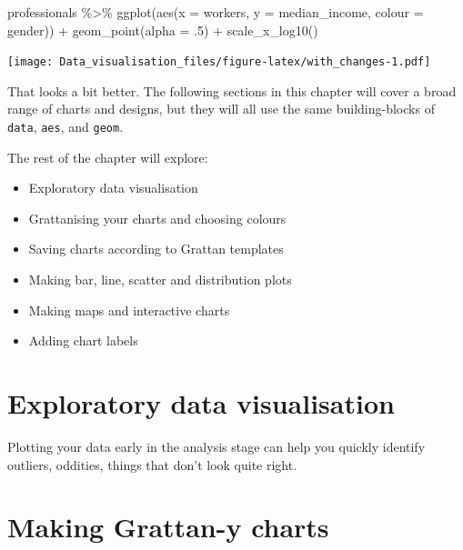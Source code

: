\documentclass[
]{book}
\newenvironment{Shaded}{\begin{snugshade}}{\end{snugshade}}
\newcommand{\AttributeTok}[1]{\textcolor[rgb]{0.77,0.63,0.00}{#1}}
\newcommand{\DecValTok}[1]{\textcolor[rgb]{0.00,0.00,0.81}{#1}}
\newcommand{\FunctionTok}[1]{\textcolor[rgb]{0.00,0.00,0.00}{#1}}
\newcommand{\NormalTok}[1]{#1}
\newcommand{\SpecialCharTok}[1]{\textcolor[rgb]{0.00,0.00,0.00}{#1}}
\providecommand{\tightlist}{%
  \setlength{\itemsep}{0pt}\setlength{\parskip}{0pt}}
\begin{document}
\begin{Shaded}
\begin{Highlighting}[]
\NormalTok{professionals }\SpecialCharTok{\%\textgreater{}\%} 
        \FunctionTok{ggplot}\NormalTok{(}\FunctionTok{aes}\NormalTok{(}\AttributeTok{x =}\NormalTok{ workers,}
                   \AttributeTok{y =}\NormalTok{ median\_income,}
                   \AttributeTok{colour =}\NormalTok{ gender)) }\SpecialCharTok{+} 
        \FunctionTok{geom\_point}\NormalTok{(}\AttributeTok{alpha =}\NormalTok{ .}\DecValTok{5}\NormalTok{) }\SpecialCharTok{+} 
        \FunctionTok{scale\_x\_log10}\NormalTok{()}
\end{Highlighting}
\end{Shaded}

\texttt{[image: Data\_visualisation\_files/figure-latex/with\_changes-1.pdf]}

That looks a bit better. The following sections in this chapter will cover a broad range of charts and designs, but they will all use the same building-blocks of \texttt{data}, \texttt{aes}, and \texttt{geom}.

The rest of the chapter will explore:

\begin{itemize}
\tightlist
\item
  Exploratory data visualisation
\item
  Grattanising your charts and choosing colours
\item
  Saving charts according to Grattan templates
\item
  Making bar, line, scatter and distribution plots
\item
  Making maps and interactive charts
\item
  Adding chart labels
\end{itemize}

\hypertarget{exploratory-data-visualisation}{%
\section{Exploratory data visualisation}\label{exploratory-data-visualisation}}

Plotting your data early in the analysis stage can help you quickly identify outliers, oddities, things that don't look quite right.

\hypertarget{making-grattan-y-charts}{%
\section{Making Grattan-y charts}\label{making-grattan-y-charts}}
\end{document}
